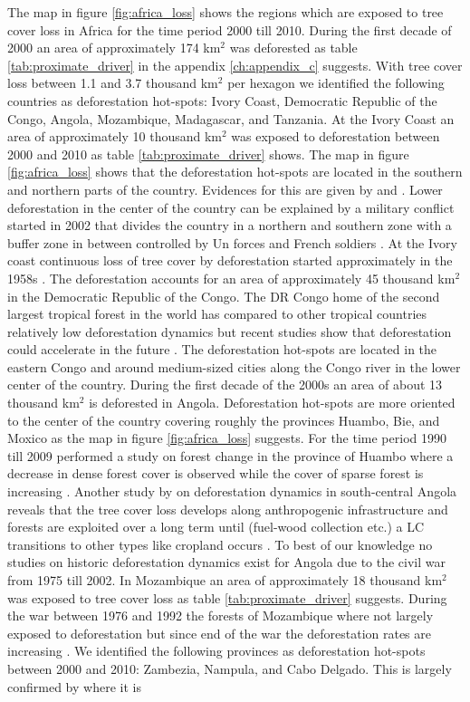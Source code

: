 			The map in figure \ref{fig:africa_loss} shows the regions which are exposed to tree cover loss in Africa for the time period 2000 till 2010. During the first decade of 2000 an area of approximately 174 km$^2$ was deforested as table \ref{tab:proximate_driver} in the appendix \ref{ch:appendix_c} suggests. With tree cover loss between 1.1 and 3.7 thousand km$^2$ per hexagon we identified the following countries as deforestation hot-spots: Ivory Coast, Democratic Republic of the Congo, Angola, Mozambique, Madagascar, and Tanzania. At the Ivory Coast an area of approximately 10 thousand km$^2$ was exposed to deforestation between 2000 and 2010 as table \ref{tab:proximate_driver} shows. The map in figure \ref{fig:africa_loss} shows that the deforestation hot-spots are located in the southern and northern parts of the country. Evidences for this are given by \citeauthor{Goetze2006} and \citeauthor{Barima2016} \citep{Barima2016,Goetze2006}. Lower deforestation in the center of the country can be explained by a military conflict started in 2002 that divides the country in a northern and southern zone with a buffer zone in between controlled by Un forces and French soldiers \citeauthor{Barima2016}. At the Ivory coast continuous loss of tree cover by deforestation started approximately in the 1958s \citep{Chatelain1996}. The deforestation accounts for an area of approximately 45 thousand km$^2$ in the Democratic Republic of the Congo. The DR Congo home of the second largest tropical forest in the world has compared to other tropical countries relatively low deforestation dynamics but recent studies show that deforestation could accelerate in the future \citep{Ickowitz2015}. The deforestation hot-spots are located in the eastern Congo and around medium-sized cities along the Congo river in the lower center of the country. During the first decade of the 2000s an area of about 13 thousand km$^2$ is deforested in Angola. Deforestation hot-spots are more oriented to the center of the country covering roughly the provinces Huambo, Bie, and Moxico as the map in figure \ref{fig:africa_loss} suggests. For the time period 1990 till 2009 \citeauthor{Cabral2011} performed a study on forest change in the province of Huambo where a decrease in dense forest cover is observed while the cover of sparse forest is increasing \citep{Cabral2011}. Another study by \citeauthor{Schneibel2017} on deforestation dynamics in south-central Angola reveals that the tree cover loss develops along anthropogenic infrastructure and forests are exploited over a long term until (fuel-wood collection etc.) a \ac{LC} transitions to other types like cropland occurs \citep{Schneibel2017}. To best of our knowledge no studies on historic deforestation dynamics exist for Angola due to the civil war from 1975 till 2002. In Mozambique an area of approximately 18 thousand km$^2$ was exposed to tree cover loss as table \ref{tab:proximate_driver} suggests. During the war between 1976 and 1992 the forests of Mozambique where not largely exposed to deforestation but since end of the war the deforestation rates are increasing \citep{Sitoe2012}. We identified the following provinces as deforestation hot-spots between 2000 and 2010: Zambezia, Nampula, and Cabo Delgado. This is largely confirmed by \citeauthor{Sitoe2012} where it is 